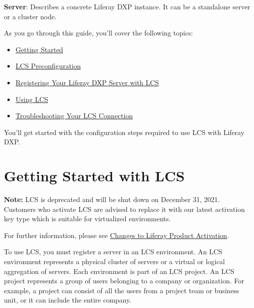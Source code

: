 \textbf{Server}: Describes a concrete Liferay DXP instance. It can be a
standalone server or a cluster node.

As you go through this guide, you'll cover the following topics:

\begin{itemize}
\tightlist
\item
  \href{/docs/7-2/deploy/-/knowledge_base/d/getting-started-with-lcs}{Getting
  Started}
\item
  \href{/docs/7-2/deploy/-/knowledge_base/d/lcs-preconfiguration}{LCS
  Preconfiguration}
\item
  \href{/docs/7-2/deploy/-/knowledge_base/d/activating-your-liferay-dxp-server-with-lcs}{Registering
  Your Liferay DXP Server with LCS}
\item
  \href{/docs/7-2/deploy/-/knowledge_base/d/using-lcs}{Using LCS}
\item
  \href{/docs/7-2/deploy/-/knowledge_base/d/troubleshooting-your-lcs-connection}{Troubleshooting
  Your LCS Connection}
\end{itemize}

You'll get started with the configuration steps required to use LCS with
Liferay DXP.

\chapter{Getting Started with LCS}\label{getting-started-with-lcs}

\noindent\hrulefill

\textbf{Note:} LCS is deprecated and will be shut down on December 31,
2021. Customers who activate LCS are advised to replace it with our
latest activation key type which is suitable for virtualized
environments.

For further information, please see
\href{https://help.liferay.com/hc/en-us/articles/4402347960845-Changes-to-Liferay-Product-Activation}{Changes
to Liferay Product Activation}.

\noindent\hrulefill

To use LCS, you must register a server in an LCS environment. An LCS
environment represents a physical cluster of servers or a virtual or
logical aggregation of servers. Each environment is part of an LCS
project. An LCS project represents a group of users belonging to a
company or organization. For example, a project can consist of all the
users from a project team or business unit, or it can include the entire
company.

